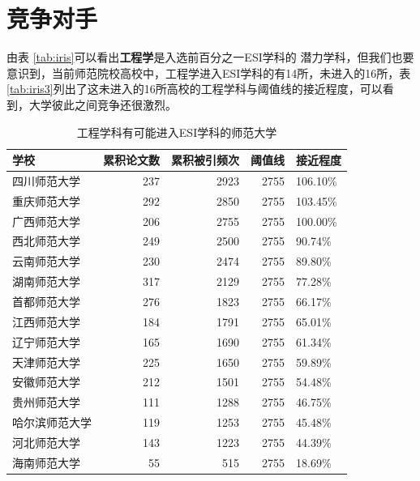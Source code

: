 \documentclass[cn, 11pt, fancy, hide]{elegantbook}
\begin{document}
\hypertarget{ux7adeux4e89ux5bf9ux624b}{%
\section{竞争对手}\label{ux7adeux4e89ux5bf9ux624b}}

由表 \ref{tab:iris}可以看出\textbf{工程学}是入选前百分之一ESI学科的 潜力学科，但我们也要意识到，当前师范院校高校中，工程学进入ESI学科的有14所，未进入的16所，表 \ref{tab:iris3}列出了这未进入的16所高校的工程学科与阈值线的接近程度，可以看到，大学彼此之间竞争还很激烈。

\begin{table}[!h]

\caption{\label{tab:iris2}工程学科有可能进入ESI学科的师范大学}
\centering
\begin{tabular}[t]{lrrrl}
\toprule
学校 & 累积论文数 & 累积被引频次 & 阈值线 & 接近程度\\
\midrule
四川师范大学 & 237 & 2923 & 2755 & 106.10\%\\
重庆师范大学 & 292 & 2850 & 2755 & 103.45\%\\
广西师范大学 & 206 & 2755 & 2755 & 100.00\%\\
西北师范大学 & 249 & 2500 & 2755 & 90.74\%\\
云南师范大学 & 230 & 2474 & 2755 & 89.80\%\\
\addlinespace
湖南师范大学 & 317 & 2129 & 2755 & 77.28\%\\
首都师范大学 & 276 & 1823 & 2755 & 66.17\%\\
江西师范大学 & 184 & 1791 & 2755 & 65.01\%\\
辽宁师范大学 & 165 & 1690 & 2755 & 61.34\%\\
天津师范大学 & 225 & 1650 & 2755 & 59.89\%\\
\addlinespace
安徽师范大学 & 212 & 1501 & 2755 & 54.48\%\\
贵州师范大学 & 111 & 1288 & 2755 & 46.75\%\\
哈尔滨师范大学 & 119 & 1253 & 2755 & 45.48\%\\
河北师范大学 & 143 & 1223 & 2755 & 44.39\%\\
海南师范大学 & 55 & 515 & 2755 & 18.69\%\\
\bottomrule
\end{tabular}
\end{table}
\end{document}
